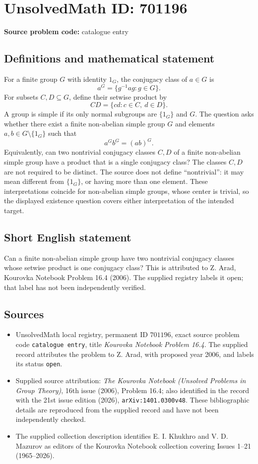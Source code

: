 \documentclass[11pt]{article}
\begin{document}
\section*{UnsolvedMath ID: 701196}
\textbf{Source problem code:} catalogue entry
\subsection{Definitions and mathematical statement}
For a finite group \(G\) with identity \(1_G\), the conjugacy class of \(a\in G\) is
\[
a^G=\{g^{-1}ag:g\in G\}.
\]
For subsets \(C,D\subseteq G\), define their setwise product by
\[
CD=\{cd:c\in C,\ d\in D\}.
\]
A group is simple if its only normal subgroups are \(\{1_G\}\) and \(G\). The question asks whether there exist a finite non-abelian simple group \(G\) and elements \(a,b\in G\setminus\{1_G\}\) such that
\[
a^G b^G=(ab)^G.
\]
Equivalently, can two nontrivial conjugacy classes \(C,D\) of a finite non-abelian simple group have a product that is a single conjugacy class? The classes \(C,D\) are not required to be distinct. The source does not define ``nontrivial'': it may mean different from \(\{1_G\}\), or having more than one element. These interpretations coincide for non-abelian simple groups, whose center is trivial, so the displayed existence question covers either interpretation of the intended target.
\subsection{Short English statement}
Can a finite non-abelian simple group have two nontrivial conjugacy classes whose setwise product is one conjugacy class? This is attributed to Z. Arad, Kourovka Notebook Problem 16.4 (2006). The supplied registry labels it open; that label has not been independently verified.
\subsection{Sources}
\begin{itemize}
\item UnsolvedMath local registry, permanent ID \(701196\), exact source problem code \texttt{catalogue entry}, title \emph{Kourovka Notebook Problem 16.4}. The supplied record attributes the problem to Z. Arad, with proposed year 2006, and labels its status \texttt{open}.
\item Supplied source attribution: \emph{The Kourovka Notebook (Unsolved Problems in Group Theory)}, 16th issue (2006), Problem 16.4; also identified in the record with the 21st issue edition (2026), \texttt{arXiv:1401.0300v48}. These bibliographic details are reproduced from the supplied record and have not been independently checked.
\item The supplied collection description identifies E. I. Khukhro and V. D. Mazurov as editors of the Kourovka Notebook collection covering Issues 1--21 (1965--2026).
\end{itemize}
\end{document}
